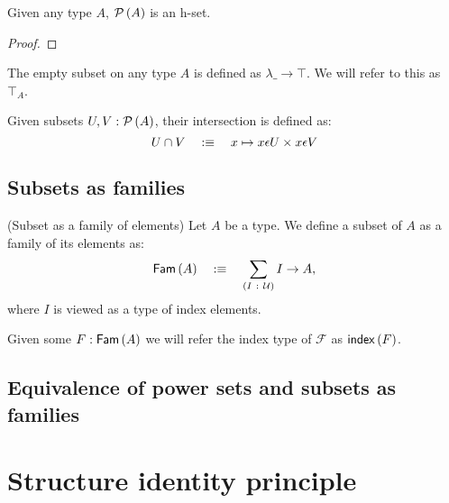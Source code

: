 \begin{prop}\label{isSetPow}
  Given any type $A$, $\mathcal{P}\left(A\right)$ is an h-set.
\end{prop}
\begin{proof}
\end{proof}

\begin{defn}\label{defn:full-set}
  The empty subset on any type $A$ is defined as $\lambda \_ \rightarrow \top$. We will refer to this as
  $\top_A$.
\end{defn}

\begin{defn}\label{defn:set-intersection}
  Given subsets $U, V : \mathcal{P}\left(A\right)$, their intersection is defined as:
  \begin{equation*}
    U \cap V \quad:\equiv\quad x \mapsto x \epsilon U \times x \epsilon V
  \end{equation*}
\end{defn}

\subsection{Subsets as families}

\begin{defn}(Subset as a family of elements)\label{defn:fam}
  Let $A$ be a type. We define a subset of $A$ as a family of its elements as:
  \begin{equation*}
    \mathsf{Fam}\left(A\right) \quad:\equiv\quad \sum_{(I~:~\mathcal{U})} I \rightarrow A,
  \end{equation*}
  where $I$ is viewed as a type of index elements.

  Given some $F : \mathsf{Fam}\left(A\right)$ we will refer the index type of $\mathcal{F}$ as
  $\mathsf{index}{}\left(F\right)$.
\end{defn}

\subsection{Equivalence of power sets and subsets as families}


\section{Structure identity principle}\label{sec:sip}
